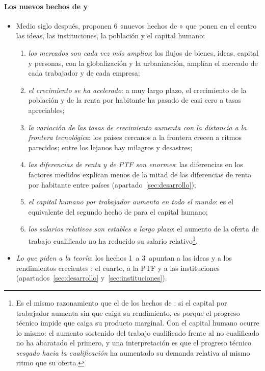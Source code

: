 \documentclass[11pt]{article}
\begin{document}
\paragraph{Los nuevos hechos de  y }

\begin{itemize}
\item Medio siglo después, \textcite{JonesRomer2010} proponen 6 «nuevos hechos de » que ponen en el centro las ideas, las instituciones, la población y el capital humano:
  \begin{enumerate}
  \item \emph{los mercados son cada vez más amplios}: los flujos de bienes, ideas, capital y personas, con la globalización y la urbanización, amplían el mercado de cada trabajador y de cada empresa;
  \item \emph{el crecimiento se ha acelerado}: a muy largo plazo, el crecimiento de la población y de la renta por habitante ha pasado de casi cero a tasas apreciables;
  \item \emph{la variación de las tasas de crecimiento aumenta con la distancia a la frontera tecnológica}: los países cercanos a la frontera crecen a ritmos parecidos; entre los lejanos hay milagros y desastres;
  \item \emph{las diferencias de renta y de PTF son enormes}: las diferencias en los factores medidos explican menos de la mitad de las diferencias de renta por habitante entre países (apartado~\ref{sec:desarrollo});
  \item \emph{el capital humano por trabajador aumenta en todo el mundo}: es el equivalente del segundo hecho de  para el capital humano;
  \item \emph{los salarios relativos son estables a largo plazo}: el aumento de la oferta de trabajo cualificado no ha reducido su salario relativo\footnote{Es el mismo razonamiento que el de los hechos de : si el capital por trabajador aumenta sin que caiga su rendimiento, es porque el progreso técnico impide que caiga su producto marginal. Con el capital humano ocurre lo mismo: el aumento sostenido del trabajo cualificado frente al no cualificado no ha abaratado el primero, y una interpretación es que el progreso técnico \emph{sesgado hacia la cualificación} ha aumentado su demanda relativa al mismo ritmo que su oferta.}.
  \end{enumerate}
\item \emph{Lo que piden a la teoría}: los hechos 1~a 3~apuntan a las ideas y a los rendimientos crecientes ; el cuarto, a la PTF y a las instituciones (apartados~\ref{sec:desarrollo} y~\ref{sec:instituciones}).

\end{itemize}
\end{document}
